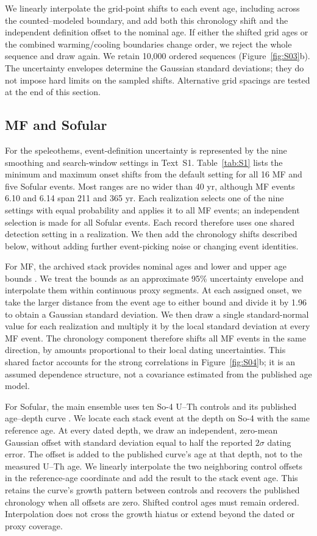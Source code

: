 \documentclass[11pt]{article}
\begin{document}
We linearly interpolate the grid-point shifts to each event age, including across the counted--modeled boundary, and add both this chronology shift and the independent definition offset to the nominal age. If either the shifted grid ages or the combined warming/cooling boundaries change order, we reject the whole sequence and draw again. We retain 10,000 ordered sequences (Figure~\ref{fig:S03}b). The uncertainty envelopes determine the Gaussian standard deviations; they do not impose hard limits on the sampled shifts. Alternative grid spacings are tested at the end of this section.

\subsection*{MF and Sofular}

For the speleothems, event-definition uncertainty is represented by the nine smoothing and search-window settings in Text~S1. Table~\ref{tab:S1} lists the minimum and maximum onset shifts from the default setting for all 16 MF and five Sofular events. Most ranges are no wider than 40 yr, although MF events 6.10 and 6.14 span 211 and 365 yr. Each realization selects one of the nine settings with equal probability and applies it to all MF events; an independent selection is made for all Sofular events. Each record therefore uses one shared detection setting in a realization. We then add the chronology shifts described below, without adding further event-picking noise or changing event identities.

For MF, the archived stack provides nominal ages and lower and upper age bounds \citep{fohlmeister2023role,fohlmeister2023mfData}. We treat the bounds as an approximate 95\% uncertainty envelope and interpolate them within continuous proxy segments. At each assigned onset, we take the larger distance from the event age to either bound and divide it by 1.96 to obtain a Gaussian standard deviation. We then draw a single standard-normal value for each realization and multiply it by the local standard deviation at every MF event. The chronology component therefore shifts all MF events in the same direction, by amounts proportional to their local dating uncertainties. This shared factor accounts for the strong correlations in Figure~\ref{fig:S04}b; it is an assumed dependence structure, not a covariance estimated from the published age model.

For Sofular, the main ensemble uses ten So-4 U--Th controls and its published age--depth curve \citep{held2024dansgaard,held2024sofularData}. We locate each stack event at the depth on So-4 with the same reference age. At every dated depth, we draw an independent, zero-mean Gaussian offset with standard deviation equal to half the reported $2\sigma$ dating error. The offset is added to the published curve's age at that depth, not to the measured U--Th age. We linearly interpolate the two neighboring control offsets in the reference-age coordinate and add the result to the stack event age. This retains the curve's growth pattern between controls and recovers the published chronology when all offsets are zero. Shifted control ages must remain ordered. Interpolation does not cross the growth hiatus or extend beyond the dated or proxy coverage.
\end{document}

